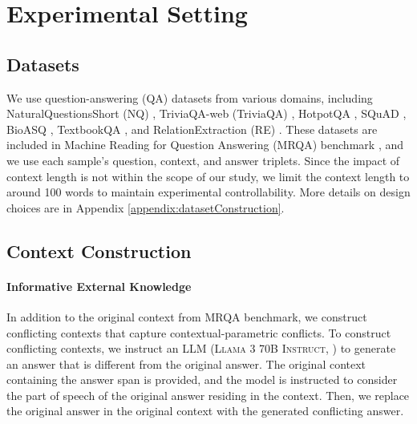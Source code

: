 
\section{Experimental Setting}


\subsection{Datasets}
We use question-answering (QA) datasets from various domains, including NaturalQuestionsShort (NQ) \citep{kwiatkowski-etal-2019-natural}, TriviaQA-web (TriviaQA) \citep{joshi2017triviaqalargescaledistantly}, HotpotQA \citep{yang2018hotpotqadatasetdiverseexplainable}, SQuAD \citep{rajpurkar2016squad100000questionsmachine}, BioASQ \citep{tsatsaronis2015overview}, TextbookQA \citep{Kembhavi_2017_CVPR}, and RelationExtraction (RE) \citep{levy2017zeroshotrelationextractionreading}. 
These datasets are included in Machine Reading for Question Answering (MRQA) benchmark \cite{fisch2019mrqa2019sharedtask}, and we use each sample's question, context, and answer triplets.
Since the impact of context length is not within the scope of our study, we limit the context length to around 100 words to maintain experimental controllability.
More details on design choices are in Appendix \ref{appendix:datasetConstruction}.



\subsection{Context Construction}


\paragraph{Informative External Knowledge} 
\label{dataset:informative-external}

In addition to the original context from MRQA benchmark, we construct conflicting contexts that capture contextual-parametric conflicts.
To construct conflicting contexts, we instruct an LLM ({\scshape Llama 3 70B Instruct}, \citealp{grattafiori2024llama3herdmodels}) to generate an answer that is different from the original answer.
The original context containing the answer span is provided, and the model is instructed to consider the part of speech of the original answer residing in the context.
Then, we replace the original answer in the original context with the generated conflicting answer. 


